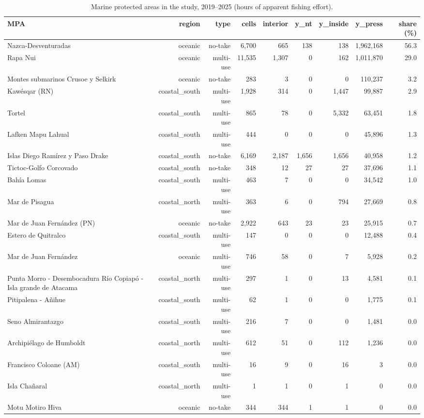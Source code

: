 \begin{table}[t]
\centering
\caption{Marine protected areas in the study, 2019--2025 (hours of apparent fishing effort).}\label{tab:mpas}
\small
\begin{tabular}{lrrrrrrrr}
\toprule
MPA & region & type & cells & interior & y\_nt & y\_inside & y\_press & share (\%) \\
\midrule
Nazca-Desventuradas & oceanic & no-take & 6,700 & 665 & 138 & 138 & 1,962,168 & 56.3 \\
Rapa Nui & oceanic & multi-use & 11,535 & 1,307 & 0 & 162 & 1,011,870 & 29.0 \\
Montes submarinos Crusoe y Selkirk & oceanic & no-take & 283 & 3 & 0 & 0 & 110,237 & 3.2 \\
Kawésqar (RN) & coastal\_south & multi-use & 1,928 & 314 & 0 & 1,447 & 99,887 & 2.9 \\
Tortel & coastal\_south & multi-use & 865 & 78 & 0 & 5,332 & 63,451 & 1.8 \\
Lafken Mapu Lahual & coastal\_south & multi-use & 444 & 0 & 0 & 0 & 45,896 & 1.3 \\
Islas Diego Ramírez y Paso Drake & coastal\_south & no-take & 6,169 & 2,187 & 1,656 & 1,656 & 40,958 & 1.2 \\
Tictoc-Golfo Corcovado & coastal\_south & no-take & 348 & 12 & 27 & 27 & 37,696 & 1.1 \\
Bahía Lomas & coastal\_south & multi-use & 463 & 7 & 0 & 0 & 34,542 & 1.0 \\
Mar de Pisagua & coastal\_north & multi-use & 363 & 6 & 0 & 794 & 27,669 & 0.8 \\
Mar de Juan Fernández (PN) & oceanic & no-take & 2,922 & 643 & 23 & 23 & 25,915 & 0.7 \\
Estero de Quitralco & coastal\_south & multi-use & 147 & 0 & 0 & 0 & 12,488 & 0.4 \\
Mar de Juan Fernández & oceanic & multi-use & 746 & 58 & 0 & 7 & 5,928 & 0.2 \\
Punta Morro - Desembocadura Río Copiapó - Isla grande de Atacama & coastal\_north & multi-use & 297 & 1 & 0 & 13 & 4,581 & 0.1 \\
Pitipalena - Añihue & coastal\_south & multi-use & 62 & 1 & 0 & 0 & 1,775 & 0.1 \\
Seno Almirantazgo & coastal\_south & multi-use & 216 & 7 & 0 & 0 & 1,481 & 0.0 \\
Archipiélago de Humboldt & coastal\_north & multi-use & 612 & 51 & 0 & 112 & 1,236 & 0.0 \\
Francisco Coloane (AM) & coastal\_south & multi-use & 16 & 9 & 0 & 16 & 3 & 0.0 \\
Isla Chañaral & coastal\_north & multi-use & 1 & 1 & 0 & 1 & 0 & 0.0 \\
Motu Motiro Hiva & oceanic & no-take & 344 & 344 & 1 & 1 & 0 & 0.0 \\
\bottomrule
\end{tabular}
\end{table}